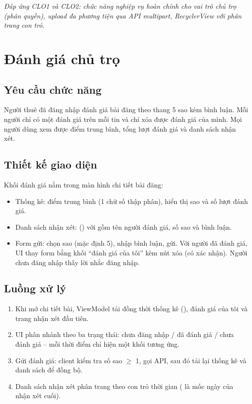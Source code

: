 \textit{Đáp ứng CLO1 và CLO2: chức năng nghiệp vụ hoàn chỉnh cho vai trò chủ
trọ (phân quyền), upload đa phương tiện qua API multipart, RecyclerView với
phân trang con trỏ.}

\section{Đánh giá chủ trọ}

\subsection{Yêu cầu chức năng}
Người thuê đã đăng nhập đánh giá bài đăng theo thang 5 sao kèm bình luận.
Mỗi người chỉ có một đánh giá trên mỗi tin và chỉ xóa được đánh giá của mình.
Mọi người dùng xem được điểm trung bình, tổng lượt đánh giá và danh sách
nhận xét.

\subsection{Thiết kế giao diện}
Khối đánh giá nằm trong màn hình chi tiết bài đăng:
\begin{itemize}
    \item Thống kê:  điểm trung bình (1 chữ số thập phân),
     hiển thị sao và  số lượt đánh giá.
    \item Danh sách nhận xét:  () với
     gồm tên người đánh giá, số sao và bình luận.
    \item Form gửi:  chọn sao (mặc định 5),
     nhập bình luận,  gửi. Với người đã
    đánh giá, UI thay form bằng khối ``đánh giá của tôi'' kèm nút xóa (có
     xác nhận). Người chưa đăng nhập thấy lời nhắc đăng nhập.
\end{itemize}

\subsection{Luồng xử lý}
\begin{enumerate}
    \item Khi mở chi tiết bài, ViewModel tải đồng thời thống kê
    (), đánh giá của tôi và trang nhận xét đầu tiên.
    \item UI phân nhánh theo ba trạng thái: chưa đăng nhập / đã đánh giá /
    chưa đánh giá -- mỗi thời điểm chỉ hiện một khối tương ứng.
    \item Gửi đánh giá: client kiểm tra số sao $\ge$ 1, gọi API, sau đó tải
    lại thống kê và danh sách để đồng bộ.
    \item Danh sách nhận xét phân trang theo con trỏ thời gian
    ( là mốc ngày của nhận xét cuối).
\end{enumerate}

